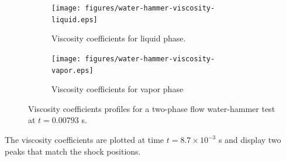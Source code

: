 \documentclass[preprint,10pt]{elsarticle}
\begin{document}
\begin{figure}[H]
        \centering
        \begin{subfigure}[b]{0.495\textwidth}
                \centering
                \texttt{[image: figures/water-hammer-viscosity-liquid.eps]}
                \caption{Viscosity coefficients for liquid phase.}
                \label{fig:water-hammer-visc-liq}
        \end{subfigure}%
        \begin{subfigure}[b]{0.495\textwidth}
                \centering
                \texttt{[image: figures/water-hammer-viscosity-vapor.eps]}
                \caption{Viscosity coefficients for vapor phase}
                \label{fig:water-hammer-visc-vap}
        \end{subfigure}
        
        \caption{Viscosity coefficients profiles for a two-phase flow water-hammer test at $t=0.00793$ s.}\label{fig:water-hammer-visc}
\end{figure}
%
The viscosity coefficients are plotted at time $t = 8.7 \times 10^{-3}$ s and display two peaks that match the shock positions.
%
\end{document}
